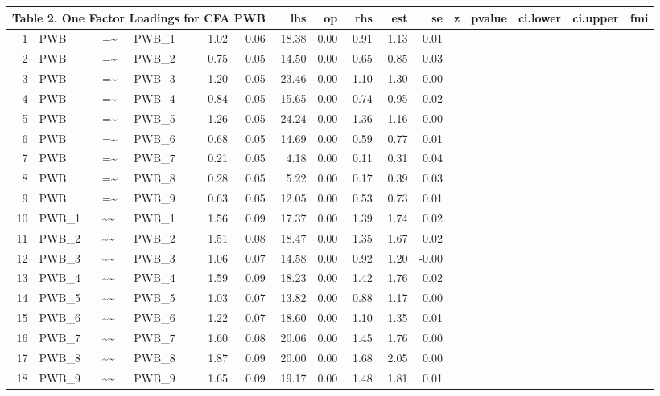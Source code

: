 \documentclass{article}
\begin{document}
\begin{table}[ht]
\centering
\begin{tabular}{rlllrrrrrrr}
 \multicolumn{ 6 }{l}{ Table 2. One Factor Loadings for CFA PWB} \cr 
  \hline
 & lhs & op & rhs & est & se & z & pvalue & ci.lower & ci.upper & fmi \\ 
  \hline
1 & PWB & =\~{} & PWB\_1 & 1.02 & 0.06 & 18.38 & 0.00 & 0.91 & 1.13 & 0.01 \\ 
  2 & PWB & =\~{} & PWB\_2 & 0.75 & 0.05 & 14.50 & 0.00 & 0.65 & 0.85 & 0.03 \\ 
  3 & PWB & =\~{} & PWB\_3 & 1.20 & 0.05 & 23.46 & 0.00 & 1.10 & 1.30 & -0.00 \\ 
  4 & PWB & =\~{} & PWB\_4 & 0.84 & 0.05 & 15.65 & 0.00 & 0.74 & 0.95 & 0.02 \\ 
  5 & PWB & =\~{} & PWB\_5 & -1.26 & 0.05 & -24.24 & 0.00 & -1.36 & -1.16 & 0.00 \\ 
  6 & PWB & =\~{} & PWB\_6 & 0.68 & 0.05 & 14.69 & 0.00 & 0.59 & 0.77 & 0.01 \\ 
  7 & PWB & =\~{} & PWB\_7 & 0.21 & 0.05 & 4.18 & 0.00 & 0.11 & 0.31 & 0.04 \\ 
  8 & PWB & =\~{} & PWB\_8 & 0.28 & 0.05 & 5.22 & 0.00 & 0.17 & 0.39 & 0.03 \\ 
  9 & PWB & =\~{} & PWB\_9 & 0.63 & 0.05 & 12.05 & 0.00 & 0.53 & 0.73 & 0.01 \\ 
  10 & PWB\_1 & \~{}\~{} & PWB\_1 & 1.56 & 0.09 & 17.37 & 0.00 & 1.39 & 1.74 & 0.02 \\ 
  11 & PWB\_2 & \~{}\~{} & PWB\_2 & 1.51 & 0.08 & 18.47 & 0.00 & 1.35 & 1.67 & 0.02 \\ 
  12 & PWB\_3 & \~{}\~{} & PWB\_3 & 1.06 & 0.07 & 14.58 & 0.00 & 0.92 & 1.20 & -0.00 \\ 
  13 & PWB\_4 & \~{}\~{} & PWB\_4 & 1.59 & 0.09 & 18.23 & 0.00 & 1.42 & 1.76 & 0.02 \\ 
  14 & PWB\_5 & \~{}\~{} & PWB\_5 & 1.03 & 0.07 & 13.82 & 0.00 & 0.88 & 1.17 & 0.00 \\ 
  15 & PWB\_6 & \~{}\~{} & PWB\_6 & 1.22 & 0.07 & 18.60 & 0.00 & 1.10 & 1.35 & 0.01 \\ 
  16 & PWB\_7 & \~{}\~{} & PWB\_7 & 1.60 & 0.08 & 20.06 & 0.00 & 1.45 & 1.76 & 0.00 \\ 
  17 & PWB\_8 & \~{}\~{} & PWB\_8 & 1.87 & 0.09 & 20.00 & 0.00 & 1.68 & 2.05 & 0.00 \\ 
  18 & PWB\_9 & \~{}\~{} & PWB\_9 & 1.65 & 0.09 & 19.17 & 0.00 & 1.48 & 1.81 & 0.01 \\ 

\end{tabular}
\end{table}
\end{document}
